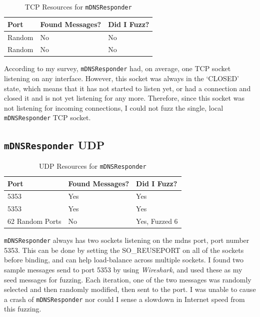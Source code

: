 \begin{table}
\centering
\begin{normalsize}
\begin{tabular}{ l | l | l }
\textbf{Port} & \textbf{Found Messages?} & \textbf{Did I Fuzz?} \\ \hline
Random & No & No \\ \hline
Random & No & No \\ \hline
\end{tabular}
\caption{TCP Resources for \texttt{mDNSResponder}}
\label{tab:mdnsTcp}
\end{normalsize}
\end{table} 

According to my survey, \texttt{mDNSResponder} had, on average, one TCP socket listening on any interface.  However, this socket was always in the `CLOSED' state, which means that it has not started to listen yet, or had a connection and closed it and is not yet listening for any more.  Therefore, since this socket was not listening for incoming connections, I could not fuzz the single, local \texttt{mDNSResponder} TCP socket.

\subsection{\texttt{mDNSResponder} UDP}
\label{sec:mdnsUdp}

\begin{table}
\centering
\begin{normalsize}
\begin{tabular}{ l | l | l }
\textbf{Port} & \textbf{Found Messages?} & \textbf{Did I Fuzz?} \\ \hline
5353 & Yes & Yes \\ \hline
5353 & Yes & Yes \\ \hline
62 Random Ports & No & Yes, Fuzzed 6 \\ \hline
\end{tabular}
\caption{UDP Resources for \texttt{mDNSResponder}}
\label{tab:mdnsUdp}
\end{normalsize}
\end{table} 

\texttt{mDNSResponder} always has two sockets listening on the mdns port, port number 5353.  This can be done by setting the SO\_REUSEPORT on all of the sockets before binding, and can help load-balance across multiple sockets.  I found two sample messages send to port 5353 by using \textit{Wireshark}, and used these as my seed messages for fuzzing.  Each iteration, one of the two messages was randomly selected and then randomly modified, then sent to the port.  I was unable to cause a crash of \texttt{mDNSResponder} nor could I sense a slowdown in Internet speed from this fuzzing.

